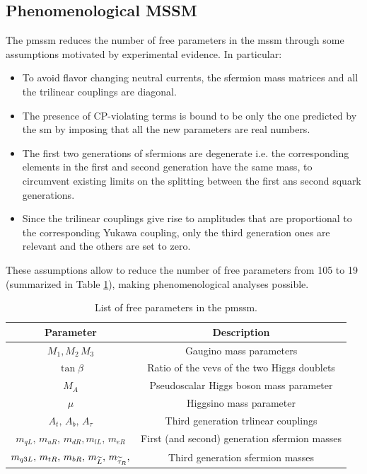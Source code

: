 \subsection{Phenomenological MSSM}
\label{sec:theory:pmssm}

The \gls{pmssm} \cite{Djouadi:1998di} reduces the number of free parameters in the \gls{mssm} through some assumptions motivated by experimental evidence. In particular:
\begin{itemize}
\item To avoid flavor changing neutral currents, the sfermion mass matrices and all the trilinear couplings are diagonal. 
\item The presence of CP-violating terms is bound to be only the one predicted by the \gls{sm} by imposing that all the new parameters are real numbers.
\item The first two generations of sfermions are degenerate i.e. the corresponding elements in the first and second generation have the same mass, to circumvent existing limits on the splitting between the first ans second squark generations.
\item Since the trilinear couplings give rise to amplitudes that are proportional to the corresponding Yukawa coupling, only the third generation ones are relevant and the others are set to zero.
\end{itemize}

These assumptions allow to reduce the number of free parameters from 105 to 19 (summarized in Table \ref{tab:pMMSpar}), making phenomenological analyses possible.


\begin{table}[h]
\centering
\begin{tabular}{c c}
\hline 
Parameter & Description \\ 
\hline 
\hline
$M_1, M_2  \, M_3 $ & Gaugino mass parameters \\ 
\hline 
$\tan \beta$ & Ratio of the \glspl{vev} of the two Higgs doublets \\ 
\hline 
$M_A$ & Pseudoscalar Higgs boson mass parameter \\ 
\hline 
$\mu$ & Higgsino mass parameter \\ 
\hline 
$  A_t, \, A_b, \, A_\tau    $ & Third generation trlinear couplings \\ 
\hline 
$m_{qL},  \,  m_{uR},  \, m_{dR},  m_{lL},  \, m_{eR}$ & First (and second) generation sfermion masses \\ 
\hline 
 $m_{q3L}, \, m_{tR}, \, m_{bR}, \, m_{\widetilde{L}}, \, m_{\widetilde{\tau}_R},$ & Third generation sfermion masses \\ 
\hline 
\end{tabular} 
\caption[Free parameters of the \gls{pmssm}]{\label{tab:pMMSpar}List of free parameters in the \gls{pmssm}.}
\end{table}





